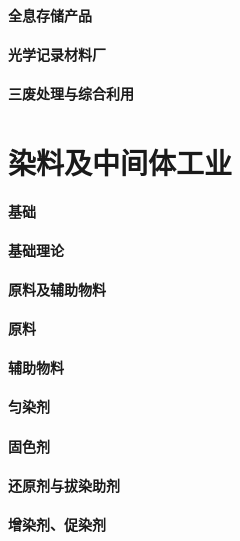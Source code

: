 \documentclass[UTF8]{../../ApplicationUniverse}
\begin{document}
        \subsubsection{全息存储产品}
\subsubsection{光学记录材料厂}
\subsubsection{三废处理与综合利用}










\chapter{染料及中间体工业}
\subsubsection{基础}
    \subsubsection{基础理论}
    \subsubsection{原料及辅助物料}
        \subsubsection{原料}
        \subsubsection{辅助物料}
        \subsubsection{匀染剂}
        \subsubsection{固色剂}
        \subsubsection{还原剂与拔染助剂}
        \subsubsection{增染剂、促染剂}
\end{document}

